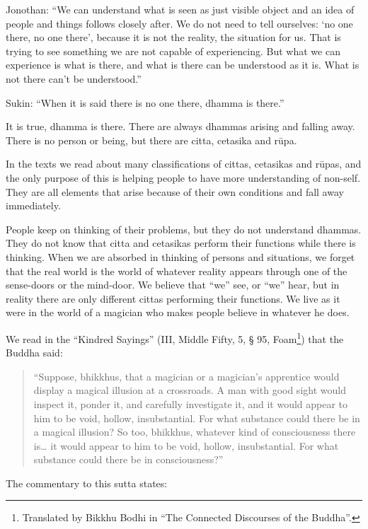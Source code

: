 Jonothan: ``We can understand what is seen as just visible object and an
idea of people and things follows closely after. We do not need to tell
ourselves: `no one there, no one there', because it is not the reality,
the situation for us. That is trying to see something we are not capable
of experiencing. But what we can experience is what is there, and what
is there can be understood as it is. What is not there can't be
understood.''

Sukin: ``When it is said there is no one there, dhamma is there.''

It is true, dhamma is there. There are always dhammas arising and
falling away. There is no person or being, but there are citta, cetasika
and rūpa.

In the texts we read about many classifications of cittas, cetasikas and
rūpas, and the only purpose of this is helping people to have more
understanding of non-self. They are all elements that arise because of
their own conditions and fall away immediately.

People keep on thinking of their problems, but they do not understand
dhammas. They do not know that citta and cetasikas perform their
functions while there is thinking. When we are absorbed in thinking of
persons and situations, we forget that the real world is the world of
whatever reality appears through one of the sense-doors or the
mind-door. We believe that ``we'' see, or ``we'' hear, but in reality
there are only different cittas performing their functions. We live as
it were in the world of a magician who makes people believe in whatever
he does.

We read in the ``Kindred Sayings'' (III, Middle Fifty, 5, § 95,
Foam\footnote{Translated by Bikkhu
Bodhi in ``The Connected Discourses of the Buddha''.}) that the Buddha
said:

\begin{quote}
``Suppose, bhikkhus, that a magician or a magician's apprentice would
display a magical illusion at a crossroads. A man with good sight would
inspect it, ponder it, and carefully investigate it, and it would appear
to him to be void, hollow, insubstantial. For what substance could there
be in a magical illusion? So too, bhikkhus, whatever kind of
consciousness there is\ldots{} it would appear to him to be
void, hollow, insubstantial. For what substance could there be in
consciousness?''
\end{quote}

The commentary to this sutta states:


